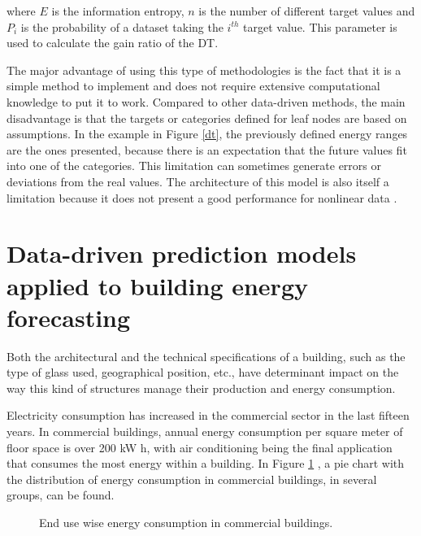 where $E$ is the information entropy, $n$ is the number of different target values and $P_i$ is the probability of a dataset taking the $i^{th}$ target value. This parameter is used to calculate the gain ratio of the \ac{DT}.

The major advantage of using this type of methodologies is the fact that it is a simple method to implement and does not require extensive computational knowledge to put it to work. Compared to other data-driven methods, the main disadvantage is that the targets or categories defined for leaf nodes are based on assumptions. In the example in Figure \ref{dt}, the previously defined energy ranges are the ones presented, because there is an expectation that the future values fit into one of the categories. 
This limitation can sometimes generate errors or deviations from the real values. The architecture of this model is also itself a limitation because it does not present a good performance for nonlinear data \cite{dt2}.


\section{Data-driven prediction models applied to building energy forecasting \label{c}}

Both the architectural and the technical specifications of a building, such as the type of glass used, geographical position, etc., have determinant impact on the way this kind of structures manage their production and energy consumption. 

Electricity consumption has increased in the commercial sector in the last fifteen years.  In commercial buildings, annual energy consumption per square meter of floor space is over 200 kW h, with air conditioning being the final application that consumes the most energy within a building\cite{pie_1}. In Figure \ref{buildingenergy} \cite{pie_1}, a pie chart with the distribution of energy consumption in commercial buildings, in several groups, can be found.


\begin{figure}[h!]
    \centering
    \begin{center}
    \caption{End use wise energy consumption in commercial buildings.}
    \label{buildingenergy}
    \end{center}
\end{figure}


